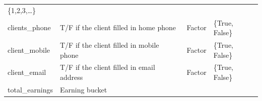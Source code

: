 \documentclass[
]{article}
\begin{document}
\begin{longtable}[]{@{}llll@{}}
\begin{minipage}[t]{0.19\columnwidth}
\{1,2,3,\ldots\}\strut
\end{minipage}\tabularnewline
\begin{minipage}[t]{0.30\columnwidth}\raggedright
clients\_phone\strut
\end{minipage} & \begin{minipage}[t]{0.30\columnwidth}\raggedright
T/F if the client filled in home phone\strut
\end{minipage} & \begin{minipage}[t]{0.11\columnwidth}\raggedright
Factor\strut
\end{minipage} & \begin{minipage}[t]{0.19\columnwidth}\raggedright
\{True, False\}\strut
\end{minipage}\tabularnewline
\begin{minipage}[t]{0.30\columnwidth}\raggedright
client\_mobile\strut
\end{minipage} & \begin{minipage}[t]{0.30\columnwidth}\raggedright
T/F if the client filled in mobile phone\strut
\end{minipage} & \begin{minipage}[t]{0.11\columnwidth}\raggedright
Factor\strut
\end{minipage} & \begin{minipage}[t]{0.19\columnwidth}\raggedright
\{True, False\}\strut
\end{minipage}\tabularnewline
\begin{minipage}[t]{0.30\columnwidth}\raggedright
client\_email\strut
\end{minipage} & \begin{minipage}[t]{0.30\columnwidth}\raggedright
T/F if the client filled in email address\strut
\end{minipage} & \begin{minipage}[t]{0.11\columnwidth}\raggedright
Factor\strut
\end{minipage} & \begin{minipage}[t]{0.19\columnwidth}\raggedright
\{True, False\}\strut
\end{minipage}\tabularnewline
\begin{minipage}[t]{0.30\columnwidth}\raggedright
total\_earnings\strut
\end{minipage} & \begin{minipage}[t]{0.30\columnwidth}\raggedright
Earning bucket\strut
\end{minipage} & \begin{minipage}[t]{0.11\columnwidth}\raggedright

\end{minipage}
\end{longtable}
\end{document}

